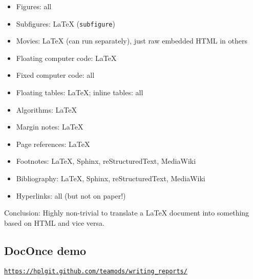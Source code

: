 \documentclass[%
oneside,                 %
final,                   %
10pt]{article}
\begin{document}
\begin{itemize}
 \item Figures: all

 \item Subfigures: {\LaTeX} (\texttt{subfigure})

 \item Movies: {\LaTeX} (can run separately), just raw embedded HTML in others

 \item Floating computer code: {\LaTeX}

 \item Fixed computer code: all

 \item Floating tables: {\LaTeX}; inline tables: all

 \item Algorithms: {\LaTeX}

 \item Margin notes: {\LaTeX}

 \item Page references: {\LaTeX}

 \item Footnotes: {\LaTeX}, Sphinx, reStructuredText, MediaWiki

 \item Bibliography: {\LaTeX}, Sphinx, reStructuredText, MediaWiki

 \item Hyperlinks: all (but not on paper!)
\end{itemize}

\noindent

Conclusion: Highly non-trivial to translate a {\LaTeX} document into something
based on HTML and vice versa.

\subsection{DocOnce demo}

\href{{https://hplgit.github.com/teamods/writing_reports/}}{\nolinkurl{https://hplgit.github.com/teamods/writing_reports/}}
\end{document}
